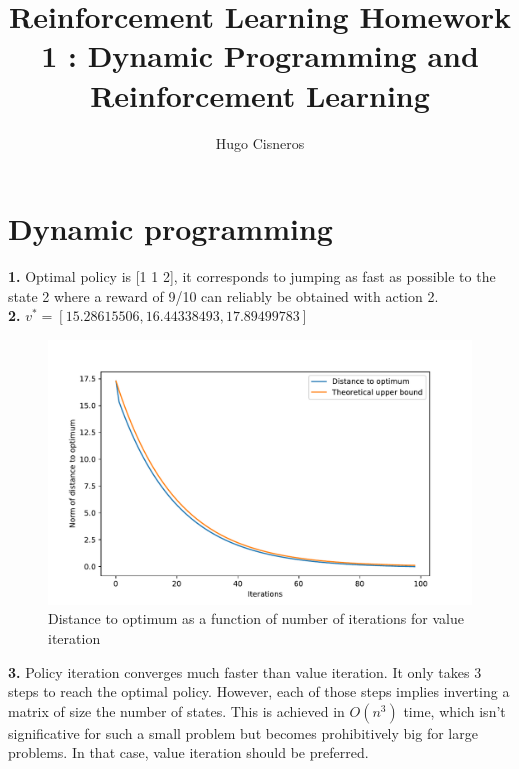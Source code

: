 \documentclass[11pt, oneside]{article}   	%
\title{Reinforcement Learning Homework 1 : Dynamic Programming and Reinforcement Learning}
\author{Hugo Cisneros}
\date{}							%
\begin{document}
\maketitle
\section{Dynamic programming}
\textbf{1.} Optimal policy is [1 1 2], it corresponds to jumping as fast as possible to the state 2 where a reward of 9/10 can reliably be obtained with action 2.
\\

\textbf{2.} $v^* = [15.28615506, 16.44338493, 17.89499783]$
\begin{figure}[h!]
\begin{center}
\includegraphics[width=.8\linewidth]{value_iteration.pdf}
\caption{Distance to optimum as a function of number of iterations for value iteration}
\label{default}
\end{center}
\end{figure}

\textbf{3.} Policy iteration converges much faster than value iteration. It only takes 3 steps to reach the optimal policy. However, each of those steps  implies inverting a matrix of size the number of states. This is achieved in $O(n^3)$ time, which isn't significative for such a small problem but becomes prohibitively big for large problems. In that case, value iteration should be preferred. 

\end{document}
